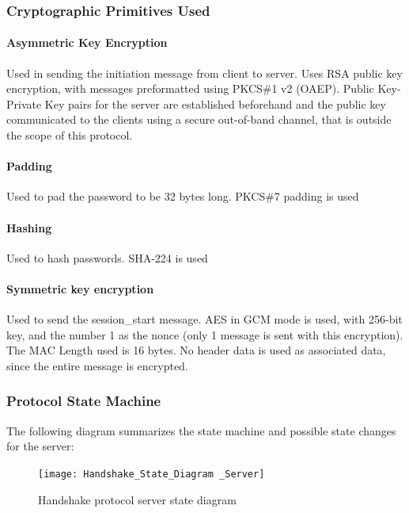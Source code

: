 \documentclass[12pt]{article}
\begin{document}
\subsubsection{Cryptographic Primitives Used}

\paragraph{Asymmetric Key Encryption}

Used in sending the initiation message from client to server. Uses RSA public key encryption, with messages preformatted using PKCS\#1 v2 (OAEP). Public Key-Private Key pairs for the server are established beforehand and the public key communicated to the clients using a secure out-of-band channel, that is outside the scope of this protocol.

\paragraph{Padding}

Used to pad the password to be 32 bytes long. PKCS\#7 padding is used

\paragraph{Hashing}

Used to hash passwords. SHA-224 is used

\paragraph{Symmetric key encryption}

Used to send the session\_start message. AES in GCM mode is used, with 256-bit key, and the number 1 as the nonce (only 1 message is sent with this encryption). The MAC Length used is 16 bytes. No header data is used as associated data, since the entire message is encrypted.

\subsubsection{Protocol State Machine}

The following diagram summarizes the state machine and possible state changes for the server:

\begin{figure}[h]
    \centering
    \texttt{[image: Handshake\_State\_Diagram \_Server]}
    \caption{Handshake protocol server state diagram}
    \label{fig:handshake_state_server}
\end{figure}
\end{document}
